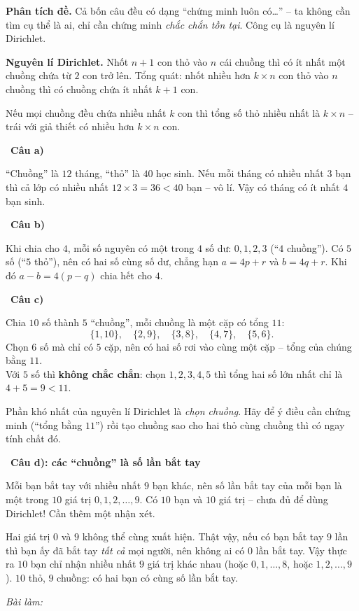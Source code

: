 \documentclass[11pt]{article}
\newif\ifsol \solfalse
\newcommand{\StuProb}[2]{\begin{probboxS}{#1}{#2}\StuProbBody\end{probboxS}}
\newcommand{\probsol}[1]{%
  \begin{lrbox}{\solmeasure}\begin{minipage}{\dimexpr\linewidth-24pt\relax}#1\end{minipage}\end{lrbox}%
  \ifsol
    \begin{solbox}#1\end{solbox}%
  \else
    \setlength{\solht}{\dimexpr\ht\solmeasure+\dp\solmeasure+0.85cm\relax}%
    \ifdim\solht<1.35cm\setlength{\solht}{1.35cm}\fi
    \ifdim\solht>\StudentMaxWork\setlength{\solht}{\StudentMaxWork}\fi
    \par\noindent\begin{minipage}{\linewidth}%
    \expandafter\StuProb\StuProbArgs
    \begin{tcolorbox}[colback=white,colframe=Line,boxrule=0.8pt,arc=5pt,
      left=8pt,right=8pt,top=4pt,bottom=4pt,height=\solht]{\footnotesize\color{Slate}\itshape\WorkWord}\end{tcolorbox}%
    \end{minipage}\par\medskip
  \fi}
\newlength{\StudentMaxWork}\setlength{\StudentMaxWork}{4.5cm}
\newcommand{\step}[2]{\par\smallskip\noindent{\bfseries\color{tmBlue!85!black}\StepWord~#1.}\ {\bfseries #2}\par\nopagebreak}
\def\WorkWord{Bài làm:}
\def\StepWord{Bước}
\begin{document}
\probsol{
\textbf{Phân tích đề.} Cả bốn câu đều có dạng ``chứng minh luôn có\dots'' -- ta không cần tìm cụ thể là ai, chỉ cần chứng minh
\emph{chắc chắn tồn tại}. Công cụ là nguyên lí Dirichlet.
\begin{recallbox}\textbf{Nguyên lí Dirichlet.} Nhốt $n + 1$ con thỏ vào $n$ cái chuồng thì có ít nhất một chuồng chứa từ $2$ con trở
lên. Tổng quát: nhốt nhiều hơn $k\times n$ con thỏ vào $n$ chuồng thì có chuồng chứa ít nhất $k + 1$ con.\end{recallbox}
\begin{proofbox}Nếu mọi chuồng đều chứa nhiều nhất $k$ con thì tổng số thỏ nhiều nhất là $k\times n$ -- trái với giả thiết có nhiều hơn
$k\times n$ con.\end{proofbox}
\step{1}{Câu a)}
``Chuồng'' là $12$ tháng, ``thỏ'' là $40$ học sinh. Nếu mỗi tháng có nhiều nhất $3$ bạn thì cả lớp có nhiều nhất $12\times 3 = 36 < 40$
bạn -- vô lí. Vậy có tháng có ít nhất $4$ bạn sinh.
\step{2}{Câu b)}
Khi chia cho $4$, mỗi số nguyên có một trong $4$ số dư: $0, 1, 2, 3$ (``$4$ chuồng''). Có $5$ số (``$5$ thỏ''), nên có hai số cùng số
dư, chẳng hạn $a = 4p + r$ và $b = 4q + r$. Khi đó $a - b = 4(p - q)$ chia hết cho $4$.
\step{3}{Câu c)}
Chia $10$ số thành $5$ ``chuồng'', mỗi chuồng là một cặp có tổng $11$:
\[ \{1, 10\},\quad \{2, 9\},\quad \{3, 8\},\quad \{4, 7\},\quad \{5, 6\}. \]
Chọn $6$ số mà chỉ có $5$ cặp, nên có hai số rơi vào cùng một cặp -- tổng của chúng bằng $11$.\\
Với $5$ số thì \textbf{không chắc chắn}: chọn $1, 2, 3, 4, 5$ thì tổng hai số lớn nhất chỉ là $4 + 5 = 9 < 11$.
\begin{tipbox}Phần khó nhất của nguyên lí Dirichlet là \emph{chọn chuồng}. Hãy để ý điều cần chứng minh (``tổng bằng $11$'') rồi tạo
chuồng sao cho hai thỏ cùng chuồng thì có ngay tính chất đó.\end{tipbox}
\step{4}{Câu d): các ``chuồng'' là số lần bắt tay}
Mỗi bạn bắt tay với nhiều nhất $9$ bạn khác, nên số lần bắt tay của mỗi bạn là một trong $10$ giá trị $0, 1, 2, \dots, 9$. Có $10$
bạn và $10$ giá trị -- chưa đủ để dùng Dirichlet! Cần thêm một nhận xét.
\begin{proofbox}Hai giá trị $0$ và $9$ không thể cùng xuất hiện. Thật vậy, nếu có bạn bắt tay $9$ lần thì bạn ấy đã bắt tay
\emph{tất cả} mọi người, nên không ai có $0$ lần bắt tay. Vậy thực ra $10$ bạn chỉ nhận nhiều nhất $9$ giá trị khác nhau (hoặc
$0, 1, \dots, 8$, hoặc $1, 2, \dots, 9$). $10$ thỏ, $9$ chuồng: có hai bạn có cùng số lần bắt tay.\end{proofbox}
}
\end{document}
